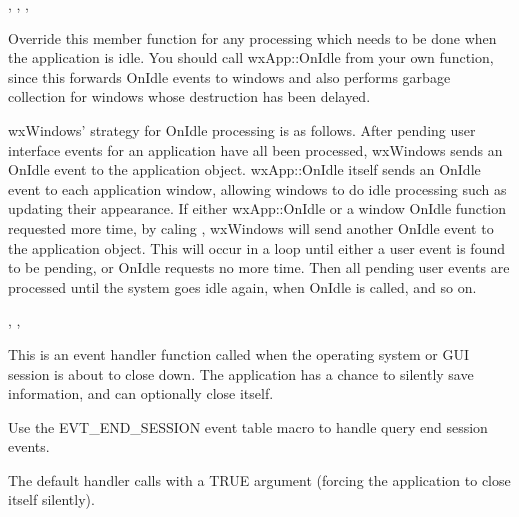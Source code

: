 
, ,\rtfsp
{}, 

\label{wxapponidle}


Override this member function for any processing which needs to be done
when the application is idle. You should call wxApp::OnIdle from your own function,
since this forwards OnIdle events to windows and also performs garbage collection for
windows whose destruction has been delayed.

wxWindows' strategy for OnIdle processing is as follows. After pending user interface events for an
application have all been processed, wxWindows sends an OnIdle event to the application object. wxApp::OnIdle itself
sends an OnIdle event to each application window, allowing windows to do idle processing such as updating
their appearance. If either wxApp::OnIdle or a window OnIdle function requested more time, by
caling , wxWindows will send another OnIdle
event to the application object. This will occur in a loop until either a user event is found to be
pending, or OnIdle requests no more time. Then all pending user events are processed until the system
goes idle again, when OnIdle is called, and so on.


, ,\rtfsp
{}

\label{wxapponendsession}


This is an event handler function called when the operating system or GUI session is
about to close down. The application has a chance to silently save information,
and can optionally close itself.

Use the EVT\_END\_SESSION event table macro to handle query end session events.

The default handler calls  with a TRUE argument
(forcing the application to close itself silently).


